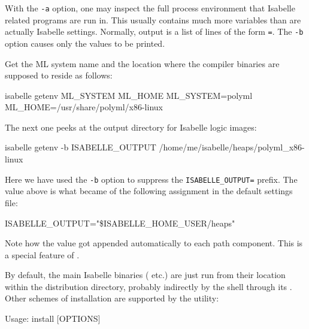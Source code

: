 \begin{isabellebody}
\begin{isamarkuptext}
  With the \verb|-a| option, one may inspect the full process
  environment that Isabelle related programs are run in. This usually
  contains much more variables than are actually Isabelle settings.
  Normally, output is a list of lines of the form \verb|=|. The \verb|-b| option
  causes only the values to be printed.%
\end{isamarkuptext}%
\isamarkuptrue%
%
\isamarkuptrue%
%
\begin{isamarkuptext}%
Get the ML system name and the location where the compiler binaries
  are supposed to reside as follows:
\begin{ttbox}
isabelle getenv ML_SYSTEM ML_HOME
{\out ML_SYSTEM=polyml}
{\out ML_HOME=/usr/share/polyml/x86-linux}
\end{ttbox}

  The next one peeks at the output directory for Isabelle logic
  images:
\begin{ttbox}
isabelle getenv -b ISABELLE_OUTPUT
{\out /home/me/isabelle/heaps/polyml_x86-linux}
\end{ttbox}
  Here we have used the \verb|-b| option to suppress the
  \verb|ISABELLE_OUTPUT=| prefix.  The value above is what
  became of the following assignment in the default settings file:
\begin{ttbox}
ISABELLE_OUTPUT="\$ISABELLE_HOME_USER/heaps"
\end{ttbox}

  Note how the \hyperlink{setting.ML-IDENTIFIER}{\mbox{}} value got appended
  automatically to each path component. This is a special feature of
  \hyperlink{setting.ISABELLE-OUTPUT}{\mbox{}}.%
\end{isamarkuptext}%
\isamarkuptrue%
%
\isamarkuptrue%
%
\begin{isamarkuptext}%
By default, the main Isabelle binaries (\hyperlink{executable.isabelle}{\mbox{}}
  etc.)  are just run from their location within the distribution
  directory, probably indirectly by the shell through its \hyperlink{setting.PATH}{\mbox{}}.  Other schemes of installation are supported by the
  \hypertarget{tool.install}{\hyperlink{tool.install}{\mbox{}}} utility:
\begin{ttbox}
Usage: install [OPTIONS]


\end{ttbox}
\end{isamarkuptext}
\end{isabellebody}
